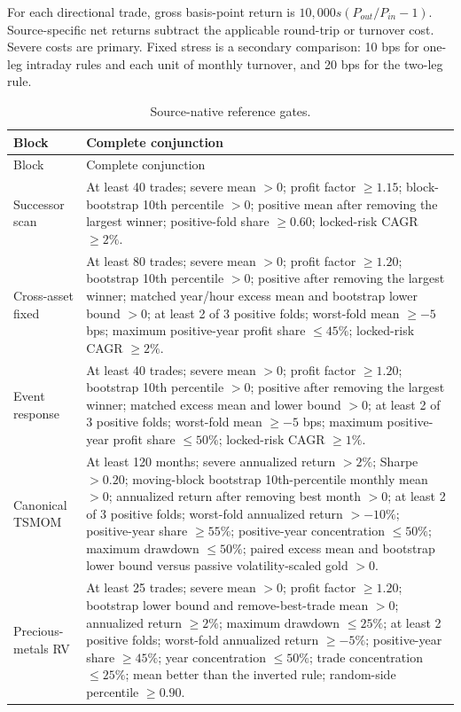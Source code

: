 \documentclass[a4paper,fleqn]{cas-sc}
\begin{document}
For each directional trade, gross basis-point return is $10{,}000s(P_{out}/P_{in}-1)$. Source-specific net returns subtract the applicable round-trip or turnover cost. Severe costs are primary. Fixed stress is a secondary comparison: 10 bps for one-leg intraday rules and each unit of monthly turnover, and 20 bps for the two-leg rule.

\begin{longtable}{P{2.4cm}P{10.7cm}}
\caption{Source-native reference gates.}\label{tab:s_gates}\\
\toprule Block & Complete conjunction \\
\midrule\endfirsthead
\toprule Block & Complete conjunction \\
\midrule\endhead
Successor scan & At least 40 trades; severe mean $>0$; profit factor $\ge1.15$; block-bootstrap 10th percentile $>0$; positive mean after removing the largest winner; positive-fold share $\ge0.60$; locked-risk CAGR $\ge2\%$. \\
Cross-asset fixed & At least 80 trades; severe mean $>0$; profit factor $\ge1.20$; bootstrap 10th percentile $>0$; positive after removing the largest winner; matched year/hour excess mean and bootstrap lower bound $>0$; at least 2 of 3 positive folds; worst-fold mean $\ge-5$ bps; maximum positive-year profit share $\le45\%$; locked-risk CAGR $\ge2\%$. \\
Event response & At least 40 trades; severe mean $>0$; profit factor $\ge1.20$; bootstrap 10th percentile $>0$; positive after removing the largest winner; matched excess mean and lower bound $>0$; at least 2 of 3 positive folds; worst-fold mean $\ge-5$ bps; maximum positive-year profit share $\le50\%$; locked-risk CAGR $\ge1\%$. \\
Canonical TSMOM & At least 120 months; severe annualized return $>2\%$; Sharpe $>0.20$; moving-block bootstrap 10th-percentile monthly mean $>0$; annualized return after removing best month $>0$; at least 2 of 3 positive folds; worst-fold annualized return $>-10\%$; positive-year share $\ge55\%$; positive-year concentration $\le50\%$; maximum drawdown $\le50\%$; paired excess mean and bootstrap lower bound versus passive volatility-scaled gold $>0$. \\
Precious-metals RV & At least 25 trades; severe mean $>0$; profit factor $\ge1.20$; bootstrap lower bound and remove-best-trade mean $>0$; annualized return $\ge2\%$; maximum drawdown $\le25\%$; at least 2 positive folds; worst-fold annualized return $\ge-5\%$; positive-year share $\ge45\%$; year concentration $\le50\%$; trade concentration $\le25\%$; mean better than the inverted rule; random-side percentile $\ge0.90$. \\
\bottomrule
\end{longtable}
\end{document}
